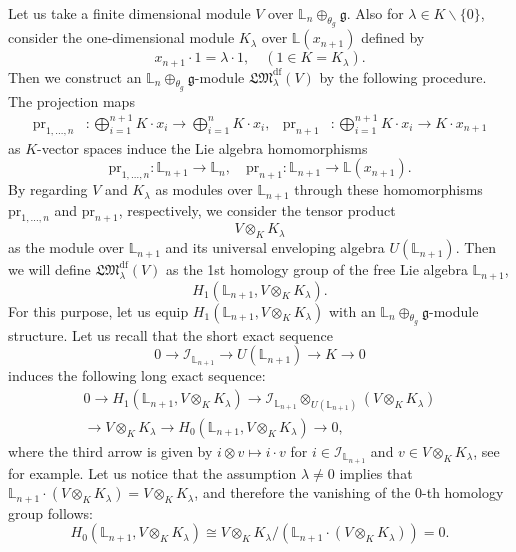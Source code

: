 \documentclass[a4paper,12pt]{article}
\theoremstyle{definition}
\theoremstyle{remark}
\begin{document}
Let us take a finite dimensional module $V$ over  
$\mathbb{L}_{n}\oplus_{\theta_{g}} \mathfrak{g}$.
Also for $\lambda\in K\backslash\{0\}$, 
consider the one-dimensional module $K_{\lambda}$ over $\mathbb{L}(x_{n+1})$ defined by
\[
	x_{n+1}\cdot 1 = \lambda\cdot 1, \quad (1\in K=K_{\lambda}).
\]
Then
we construct an
$\mathbb{L}_{n}\oplus_{\theta_{g}} \mathfrak{g}$-module 
$\mathfrak{LM}^{\mathrm{df}}_{\lambda}(V)$ by the following procedure.
The projection maps
\begin{align*}
	\mathrm{pr}_{1,\ldots,n}&\colon \bigoplus_{i=1}^{n+1}K\cdot x_{i}
	\rightarrow \bigoplus_{i=1}^{n}K\cdot x_{i},&
	\mathrm{pr}_{n+1}&\colon \bigoplus_{i=1}^{n+1}K\cdot x_{i}
	\rightarrow K\cdot x_{n+1}
\end{align*}
as $K$-vector spaces
induce the Lie algebra homomorphisms
\[
	\mathrm{pr}_{1,\ldots,n}\colon \mathbb{L}_{n+1}\to \mathbb{L}_{n}, \quad
	\mathrm{pr}_{n+1}\colon \mathbb{L}_{n+1}\to \mathbb{L}(x_{n+1}).
\]
By regarding $V$ and $K_{\lambda}$
as modules over $\mathbb{L}_{n+1}$ through 
these homomorphisms $\mathrm{pr}_{1,\ldots,n}$ and $\mathrm{pr}_{n+1}$, respectively,
we consider the tensor product
\[
	V\otimes_{K} K_{\lambda}
\]
as the module over $\mathbb{L}_{n+1}$ and its universal enveloping algebra $U(\mathbb{L}_{n+1})$.
Then we will define $\mathfrak{LM}^{\mathrm{df}}_{\lambda}(V)$ as the 1st homology group of 
the free Lie algebra $\mathbb{L}_{n+1}$, 
\[
	H_1(\mathbb{L}_{n+1}, V\otimes_{K} K_{\lambda}).
\]
For this purpose, let us
equip $H_1(\mathbb{L}_{n+1}, V\otimes_{K} K_{\lambda})$
with an $\mathbb{L}_{n}\oplus_{\theta_{g}} \mathfrak{g}$-module structure.
Let us recall that the short exact sequence 
\[
	0\to \mathcal{I}_{\mathbb{L}_{n+1}}\to U(\mathbb{L}_{n+1})\to K\to 0
\]
induces the following long exact sequence:
\begin{multline}\label{eq:longexact}
	0\to H_1(\mathbb{L}_{n+1}, V\otimes_{K} K_{\lambda})
	\to 
	\mathcal{I}_{\mathbb{L}_{n+1}}\otimes_{U(\mathbb{L}_{n+1})} (V\otimes_{K} K_{\lambda})\\
	\to V\otimes_{K} K_{\lambda}\to H_0(\mathbb{L}_{n+1}, V\otimes_{K} K_{\lambda})\to 0,
\end{multline}
where the third arrow is given by $i\otimes v\mapsto i\cdot v$ for $i\in \mathcal{I}_{\mathbb{L}_{n+1}}$ and $v\in V\otimes_{K} K_{\lambda}$,
see \cite{Wei94} for example.
Let us notice that 
the assumption $\lambda\neq 0$ implies that
$\mathbb{L}_{n+1}\cdot (V\otimes_{K} K_{\lambda})
=V\otimes_{K} K_{\lambda}$, and therefore 
the vanishing of the $0$-th homology group follows:
\[
H_{0}(\mathbb{L}_{n+1}, V\otimes_{K} K_{\lambda})
\cong V\otimes_{K} K_{\lambda}/\left(\mathbb{L}_{n+1}\cdot (V\otimes_{K} K_{\lambda})\right)
=0.
\]
\end{document}
